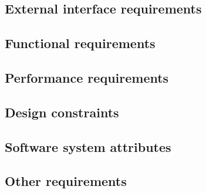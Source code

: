 \documentclass[11pt,a4paper]{report}
\begin{document}
\subsection{External interface requirements }
\subsection{ Functional requirements }
\subsection{ Performance requirements }
\subsection{ Design constraints }
\subsection{ Software system attributes }
\subsection{ Other requirements }

\clearpage
\newpage 

\listoffigures

\clearpage
\newpage 

\printindex
\end{document}

